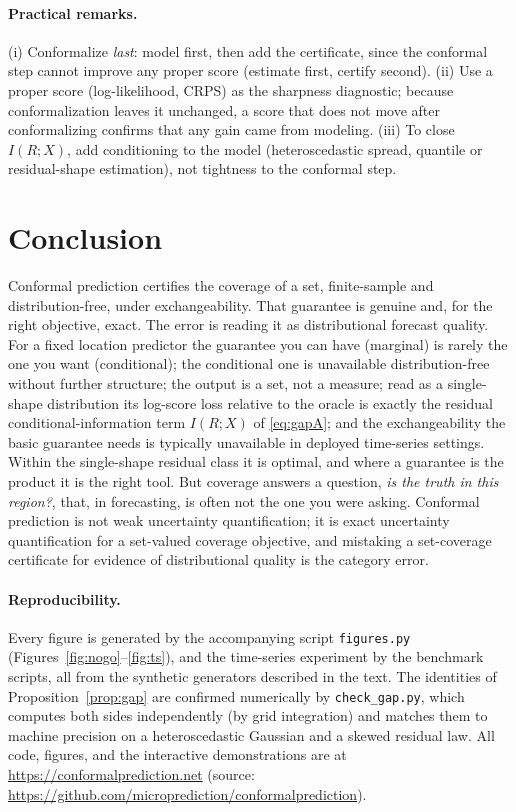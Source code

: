 \documentclass[11pt]{article}
\theoremstyle{definition}
\begin{document}
\paragraph{Practical remarks.} (i) Conformalize \emph{last}: model first, then add the
certificate, since the conformal step cannot improve any proper score (estimate first, certify
second). (ii) Use a proper score (log-likelihood, CRPS) as the sharpness diagnostic; because
conformalization leaves it unchanged, a score that does not move after conformalizing confirms
that any gain came from modeling. (iii) To close $I(R;X)$, add conditioning to the model
(heteroscedastic spread, quantile or residual-shape estimation), not tightness to the
conformal step.

\section{Conclusion}

Conformal prediction certifies the coverage of a set, finite-sample and
distribution-free, under exchangeability. That guarantee is genuine and, for the right
objective, exact. The error is reading it as distributional forecast quality. For a fixed
location predictor the guarantee you can have (marginal) is rarely the one you want
(conditional); the conditional one is unavailable distribution-free without further
structure; the output is a set, not a measure; read as a single-shape distribution its
log-score loss relative to the oracle is exactly the residual conditional-information term
$I(R;X)$ of \eqref{eq:gapA}; and the exchangeability the basic guarantee needs is typically
unavailable in deployed time-series settings. Within the single-shape residual class it is
optimal, and where a guarantee is the product it is the right tool. But coverage answers a question,
\emph{is the truth in this region?}, that, in forecasting, is often not the one you
were asking. Conformal prediction is not weak uncertainty quantification; it is exact
uncertainty quantification for a set-valued coverage objective, and mistaking a
set-coverage certificate for evidence of distributional quality is the category error.

\paragraph{Reproducibility.} Every figure is generated by the accompanying script
\texttt{figures.py} (Figures~\ref{fig:nogo}--\ref{fig:ts}), and the time-series experiment
by the benchmark scripts, all from the synthetic generators described in the text. The
identities of Proposition~\ref{prop:gap} are confirmed numerically by \texttt{check\_gap.py},
which computes both sides independently (by grid integration) and matches them to machine
precision on a heteroscedastic Gaussian and a skewed residual law. All code, figures, and
the interactive demonstrations are at \url{https://conformalprediction.net} (source:
\url{https://github.com/microprediction/conformalprediction}).

\small


\end{document}
